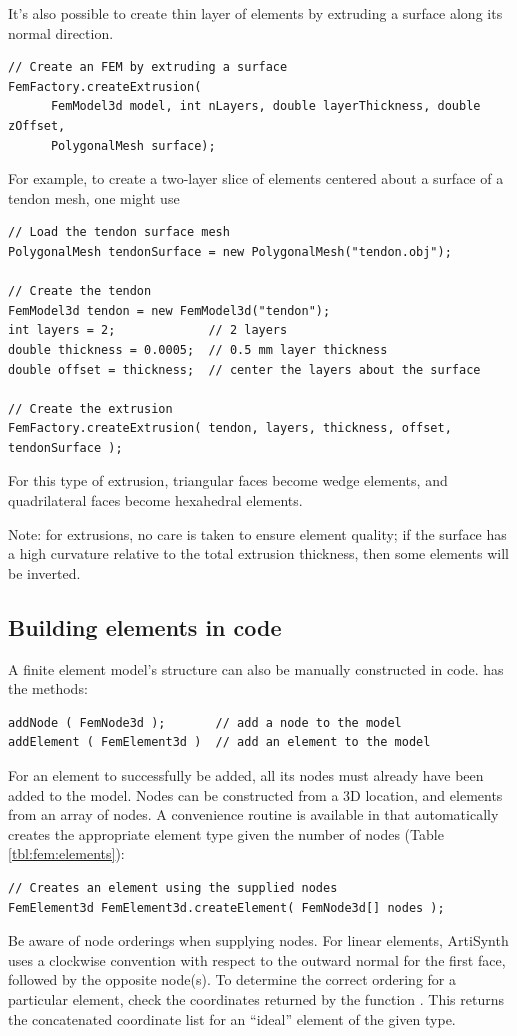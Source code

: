 It's also possible to create thin layer of elements by extruding a surface
along its normal direction. 
\begin{lstlisting}[]
// Create an FEM by extruding a surface
FemFactory.createExtrusion(
      FemModel3d model, int nLayers, double layerThickness, double zOffset, 
      PolygonalMesh surface);
\end{lstlisting}
For example, to create a two-layer slice of elements centered about a 
surface of a tendon mesh, one might use
\begin{lstlisting}[]
// Load the tendon surface mesh
PolygonalMesh tendonSurface = new PolygonalMesh("tendon.obj");

// Create the tendon
FemModel3d tendon = new FemModel3d("tendon");
int layers = 2;             // 2 layers
double thickness = 0.0005;  // 0.5 mm layer thickness
double offset = thickness;  // center the layers about the surface

// Create the extrusion
FemFactory.createExtrusion( tendon, layers, thickness, offset, tendonSurface );
\end{lstlisting} 
For this type of extrusion, triangular faces become wedge elements, and 
quadrilateral faces become hexahedral elements.  

\begin{sideblock}
Note: for extrusions, no care is taken to ensure element quality; if the 
surface has a high curvature relative to the total extrusion thickness, 
then some elements will be inverted.
\end{sideblock}

\subsection{Building elements in code}

A finite element model's structure can also be manually constructed in code.  
 has the methods:
\begin{lstlisting}[]
addNode ( FemNode3d );       // add a node to the model
addElement ( FemElement3d )  // add an element to the model
\end{lstlisting}
For an element to successfully be added, all its nodes must already have
been added to the model.  Nodes can be constructed from a 3D location, and
elements from an array of nodes.  A convenience routine is available in
 that automatically creates
the appropriate element type given the number of nodes (Table 
\ref{tbl:fem:elements}):
\begin{lstlisting}[]
// Creates an element using the supplied nodes
FemElement3d FemElement3d.createElement( FemNode3d[] nodes );
\end{lstlisting}
Be aware of node orderings when supplying nodes.  For linear elements, 
ArtiSynth uses a clockwise convention with respect to the outward
normal for the first face, followed by the opposite node(s).  To determine the
correct ordering for a particular element, check the coordinates returned by 
the function 
.
This returns the concatenated coordinate list for an ``ideal'' element of
the given type.

